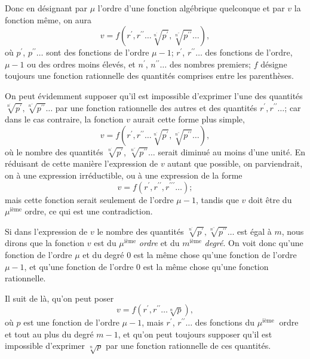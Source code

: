 \documentclass[oneside, 12 pt, leqno]{memoir}
\begin{document}
Donc en désignant par \(\mu\) l'ordre d'une fonction algébrique quelconque et par \(v\) la fonction même, on aura
\[v=f\left(r^{\prime}, r^{\prime \prime} \dots \sqrt[n^{\prime}]{p^{\prime}}, \sqrt[n^{\prime \prime}]{p^{\prime \prime}} \dots\right),\]
où \(p^{\prime}\), \(p^{\prime \prime} \dots\) sont des fonctions de l'ordre \({\mu}-1\); \(r^{\prime}\), \(r^{\prime \prime} \dots\) des fonctions de l'ordre, \(\mu-1\) ou des ordres moins élevés, et \(n^{\prime}\), \(n^{\prime \prime} \dots\) des nombres premiers; \(f\) désigne toujours une fonction rationnelle des quantités comprises entre les parenthèses.

On peut évidemment supposer qu'il est impossible d'exprimer l'une des quantités \(\sqrt[n^{\prime}]{p^{\prime}}, \sqrt[n^{\prime \prime}]{p^{\prime \prime}} \dots\) par une fonction rationnelle des autres et des quantités \(r^{\prime}, r^{\prime \prime} \dots\); car dans le cas contraire, la fonction \(v\) aurait cette forme plus simple,
\[v=f\left(r^{\prime}, r^{\prime \prime} \dots \sqrt[n^{\prime}]{p^{\prime}}, \sqrt[n^{\prime \prime}]{p^{\prime \prime}} \dots\right),\]
où le nombre des quantités \(\sqrt[n^{\prime}]{p^{\prime}}\), \(\sqrt[n^{\prime \prime}]{p^{\prime \prime}} \dots\) serait diminué au moins d'une unité. En réduisant de cette manière l'expression de \(v\) autant que possible, on parviendrait, on à une expression irréductible, ou à une expression de la forme
\[v=f\left(r^{\prime}, r^{\prime \prime}, r^{\prime \prime \prime} \dots\right);\]
mais cette fonction serait seulement de l'ordre \(\mu-1\), tandis que \(v\) doit être du \(\mu^{\text{ième}}\) ordre, ce qui est une contradiction.

Si dans l'expression de \(v\) le nombre des quantités \(\sqrt[n^{\prime}]{p^{\prime}}, \sqrt[n^{\prime \prime}]{p^{\prime \prime}} \dots\) est égal à \(m\), nous dirons que la fonction \(v\) est du \(\mu^{\text{ième}}\) \textit{ordre} et du \(m^{\text{ième}}\) \textit{degré}. On voit donc qu'une fonction de l'ordre \(\mu\) et du degré 0 est la même chose qu'une fonction de l'ordre \(\mu-1\), et qu'une fonction de l'ordre 0 est la même chose qu'une fonction rationnelle.

Il suit de là, qu’on peut poser
\[v=f\left(r^{\prime}, r^{\prime \prime} \dots \sqrt[n]{p}\right),\]
où \(p\) est une fonction de l'ordre \(\mu-1\), mais \(r^{\prime}\), \(r^{\prime \prime} \dots\) des fonctions du \(\mu^{\text {ième }}\) ordre et tout au plus du degré \(m-1\), et qu'on peut toujours supposer qu'il est impossible d'exprimer \(\sqrt[n]{p}\) par une fonction rationnelle de ces quantités.
\end{document}
